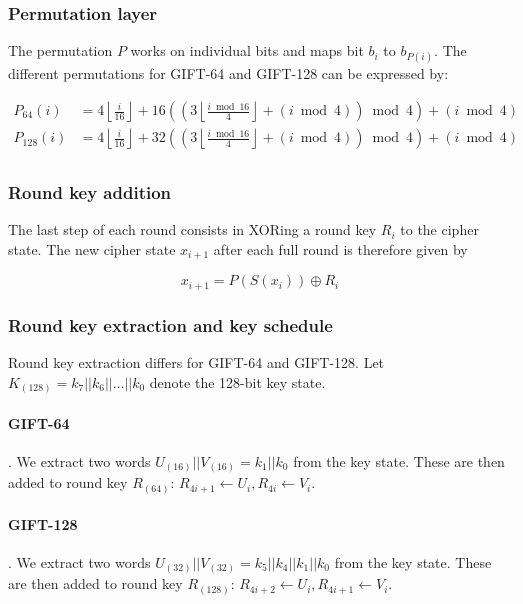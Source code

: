 \subsubsection{Permutation layer}

The permutation $P$ works on individual bits and maps bit $b_i$ to $b_{P(i)}$.
The different permutations for GIFT-64 and GIFT-128 can be expressed by:

\begin{align*}
    P_{64}(i)&=4\left\lfloor\frac{i}{16}\right\rfloor+16\left(\left(3\left\lfloor\frac{i\bmod 16}{4}\right\rfloor+(i\bmod 4)\right)\bmod 4\right)+(i\bmod 4) \\
    P_{128}(i)&=4\left\lfloor\frac{i}{16}\right\rfloor+32\left(\left(3\left\lfloor\frac{i\bmod 16}{4}\right\rfloor+(i\bmod 4)\right)\bmod 4\right)+(i\bmod 4) \\
\end{align*}

\subsubsection{Round key addition}

The last step of each round consists in XORing a round key $R_{i}$ to the cipher
state. The new cipher state $x_{i+1}$ after each full round is therefore given
by

\[
    x_{i+1}=P(S(x_i))\oplus R_i
\]

\subsubsection{Round key extraction and key schedule}

Round key extraction differs for GIFT-64 and GIFT-128. Let
$K_{(128)}=k_7||k_6||\dots||k_0$ denote the 128-bit key state.

\paragraph{GIFT-64}. We extract two words $U_{(16)}||V_{(16)}=k_1||k_0$ from the key
state. These are then added to round key $R_{(64)}$: $R_{4i+1}\leftarrow
U_i,R_{4i}\leftarrow V_i$.

\paragraph{GIFT-128}. We extract two words
$U_{(32)}||V_{(32)}=k_5||k_4||k_1||k_0$ from the key state. These are then
added to round key $R_{(128)}$: $R_{4i+2}\leftarrow U_i,R_{4i+1}\leftarrow
V_i$.

